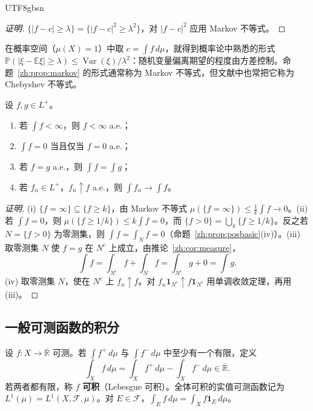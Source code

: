 \documentclass[11pt]{article}
\makeatletter
\newcommand{\envlabel}[1]{\protected@edef\@currentlabel{\themathenv}\label{#1}}
\makeatother
\begin{document}
\begin{CJK*}{UTF8}{gbsn}
\begin{proof}[证明]
$\{|f-c|\geq\lambda\}=\{|f-c|^{2}\geq\lambda^{2}\}$，对 $|f-c|^{2}$ 应用 Markov 不等式。
\end{proof}

在概率空间（$\mu(X)=1$）中取 $c=\int f\,d\mu$，就得到概率论中熟悉的形式 $\mathbb{P}(|\xi-\mathbb{E}\xi|\geq\lambda)\leq\operatorname{Var}(\xi)/\lambda^{2}$：随机变量偏离期望的程度由方差控制。命题~\ref{zh:prop:markov} 的形式通常称为 Markov 不等式，但文献中也常把它称为 Chebyshev 不等式。

\begin{corollary}\envlabel{zh:cor:ae}
设 $f,g\in L^{+}$。
\begin{enumerate}
  \item 若 $\int f<\infty$，则 $f<\infty$ a.e.；
  \item $\int f=0$ 当且仅当 $f=0$ a.e.；
  \item 若 $f=g$ a.e.，则 $\int f=\int g$；
  \item 若 $f_{n}\in L^{+}$，$f_{n}\uparrow f$ a.e.，则 $\int f_{n}\to\int f$。
\end{enumerate}
\end{corollary}

\begin{proof}[证明]
(i) $\{f=\infty\}\subseteq\{f\geq k\}$，由 Markov 不等式 $\mu(\{f=\infty\})\leq\frac1k\int f\to0$。(ii) 若 $\int f=0$，则 $\mu(\{f\geq1/k\})\leq k\int f=0$，而 $\{f>0\}=\bigcup_{k}\{f\geq1/k\}$。反之若 $N=\{f>0\}$ 为零测集，则 $\int f=\int_{N}f=0$（命题~\ref{zh:prop:posbasic}(iv)）。(iii) 取零测集 $N$ 使 $f=g$ 在 $N^{c}$ 上成立，由推论~\ref{zh:cor:measure}，
\[
\int f=\int_{N^{c}}f+\int_{N}f=\int_{N^{c}}g+0=\int g.
\]
(iv) 取零测集 $N$，使在 $N^{c}$ 上 $f_{n}\uparrow f$。对 $f_{n}\mathbf{1}_{N^{c}}\uparrow f\mathbf{1}_{N^{c}}$ 用单调收敛定理，再用 (iii)。
\end{proof}

\subsection{一般可测函数的积分}

\begin{definition}[Lebesgue 积分]\envlabel{zh:def:integral}
设 $f:X\to\overline{\mathbb{R}}$ 可测。若 $\int f^{+}\,d\mu$ 与 $\int f^{-}\,d\mu$ 中至少有一个有限，定义
\[
\int_{X}f\,d\mu=\int_{X}f^{+}\,d\mu-\int_{X}f^{-}\,d\mu\in\overline{\mathbb{R}}.
\]
若两者都有限，称 $f$ \textbf{可积}（Lebesgue 可积）。全体可积的实值可测函数记为 $L^{1}(\mu)=L^{1}(X,\mathcal{F},\mu)$。对 $E\in\mathcal{F}$，$\int_{E}f\,d\mu=\int_{X}f\mathbf{1}_{E}\,d\mu$。
\end{definition}


\end{CJK*}
\end{document}
